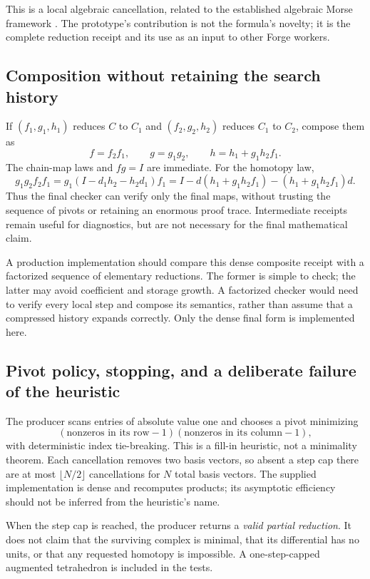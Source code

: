 \documentclass[11pt,letterpaper]{article}
\theoremstyle{definition}\newtheorem{definition}[theorem]{Definition}
\theoremstyle{remark}\newtheorem{remark}[theorem]{Remark}
\begin{document}
This is a local algebraic cancellation, related to the established algebraic
Morse framework \cite{skoldberg}. The prototype's contribution is not the
formula's novelty; it is the complete reduction receipt and its use as an
input to other Forge workers.

\subsection{Composition without retaining the search history}
If $(f_1,g_1,h_1)$ reduces $C$ to $C_1$ and $(f_2,g_2,h_2)$ reduces $C_1$ to
$C_2$, compose them as
\begin{equation}\label{eq:compose-reduction}
 f=f_2f_1,\qquad g=g_1g_2,\qquad h=h_1+g_1h_2f_1.
\end{equation}
The chain-map laws and $fg=I$ are immediate. For the homotopy law,
\[
 g_1g_2f_2f_1
 =g_1(I-d_1h_2-h_2d_1)f_1
 =I-d(h_1+g_1h_2f_1)-(h_1+g_1h_2f_1)d.
\]
Thus the final checker can verify only the final maps, without trusting the
sequence of pivots or retaining an enormous proof trace. Intermediate receipts
remain useful for diagnostics, but are not necessary for the final mathematical
claim.

A production implementation should compare this dense composite receipt with a
factorized sequence of elementary reductions. The former is simple to check;
the latter may avoid coefficient and storage growth. A factorized checker would
need to verify every local step and compose its semantics, rather than assume
that a compressed history expands correctly. Only the dense final form is
implemented here.

\subsection{Pivot policy, stopping, and a deliberate failure of the heuristic}
The producer scans entries of absolute value one and chooses a pivot minimizing
\[
  (\text{nonzeros in its row}-1)
  (\text{nonzeros in its column}-1),
\]
with deterministic index tie-breaking. This is a fill-in heuristic, not a
minimality theorem. Each cancellation removes two basis vectors, so absent a
step cap there are at most $\lfloor N/2\rfloor$ cancellations for $N$ total
basis vectors. The supplied implementation is dense and recomputes products;
its asymptotic efficiency should not be inferred from the heuristic's name.

When the step cap is reached, the producer returns a \emph{valid partial
reduction}. It does not claim that the surviving complex is minimal, that its
differential has no units, or that any requested homotopy is impossible.
A one-step-capped augmented tetrahedron is included in the tests.
\end{document}
